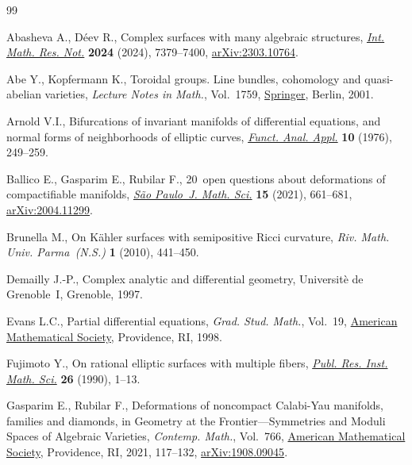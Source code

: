 \begin{thebibliography}{99}
\footnotesize\itemsep=0pt

Abasheva A., D\'eev R., Complex surfaces with many algebraic structures,
 \href{https://doi.org/10.1093/imrn/rnad190}{\textit{Int. Math. Res. Not.}}
 \textbf{2024} (2024), 7379--7400,
 \href{http://arxiv.org/abs/2303.10764}{arXiv:2303.10764}.

Abe Y., Kopfermann K., Toroidal groups. Line bundles, cohomology and
 quasi-abelian varieties, \textit{Lecture Notes in Math.}, Vol.~1759,
 \href{https://doi.org/10.1007/b80605}{Springer}, Berlin, 2001.

Arnold V.I., Bifurcations of invariant manifolds of differential equations, and
 normal forms of neighborhoods of elliptic curves,
 \href{https://doi.org/10.1007/BF01076024}{\textit{Funct. Anal. Appl.}}
 \textbf{10} (1976), 249--259.

Ballico E., Gasparim E., Rubilar F., 20~open questions about deformations of
 compactifiable manifolds,
 \href{https://doi.org/10.1007/s40863-021-00213-8}{\textit{S\~{a}o Paulo~J.
 Math. Sci.}} \textbf{15} (2021), 661--681,
 \href{http://arxiv.org/abs/2004.11299}{arXiv:2004.11299}.

Brunella M., On {K}\"ahler surfaces with semipositive {R}icci curvature,
 \textit{Riv. Math. Univ. Parma~(N.S.)} \textbf{1} (2010), 441--450.

Demailly J.-P., Complex analytic and differential geometry, Universit\`e de
 Grenoble~I, Grenoble, 1997.

Evans L.C., Partial differential equations, \textit{Grad. Stud. Math.},
 Vol.~19, \href{https://doi.org/10.1090/gsm/019}{American Mathematical
 Society}, Providence, RI, 1998.

Fujimoto Y., On rational elliptic surfaces with multiple fibers,
 \href{https://doi.org/10.2977/prims/1195171661}{\textit{Publ. Res. Inst.
 Math. Sci.}} \textbf{26} (1990), 1--13.

Gasparim E., Rubilar F., Deformations of noncompact {C}alabi-{Y}au manifolds,
 families and diamonds, in Geometry at the {F}rontier---{S}ymmetries and
 {M}oduli {S}paces of {A}lgebraic {V}arieties, \textit{Contemp. Math.}, Vol.~766, \href{https://doi.org/10.1090/conm/766/15378}{American Mathematical
 Society}, Providence, RI, 2021, 117--132,
 \href{http://arxiv.org/abs/1908.09045}{arXiv:1908.09045}.


\end{thebibliography}
